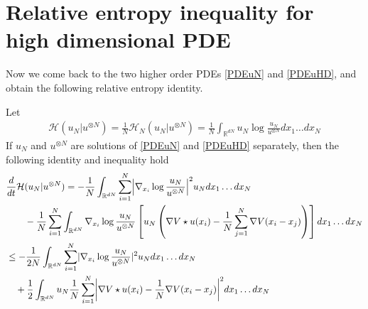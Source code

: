\section{Relative entropy inequality for high dimensional PDE}
Now we come back to the two higher order PDEs \autoref{PDEuN} and \autoref{PDEuHD}, and obtain the following relative entropy identity.
\begin{lemma} Let 
	\begin{align}
	\label{REntropyN} \mathcal{H}(u_N | u^{\otimes N} )= \frac{1}{N} \mathcal{H}_N(u_N | u^{\otimes N} ) = \frac{1}{N} \int_{\mathbb{R}^{dN} } u_N \log \frac{u_N}{u^{\otimes N} }   dx_{1}\ldots dx_N
	\end{align}
	If $u_N$ and $u^{\otimes N}$ are solutions of  \autoref{PDEuN} and \autoref{PDEuHD} separately, then the following identity and inequality hold
	\begin{align}
	\label{relativeentropyID} 
	&\frac{d}{dt} \mathcal{H}(u_{N} | u^{\otimes N}  ) = -   \frac{1}{N} \int_{\mathbb{R}^{dN} } \sum_{i=1}^{N}  \abs*{\nabla_{x_i} \log \frac{u_N}{u^{\otimes N} }}^2 u_N dx_{1}\ldots dx_N\\
\nonumber	&\qquad - \frac{1}{N} \sum_{i=1}^{N} \int_{\mathbb{R}^{dN} }  \nabla_{x_i} \log \frac{u_N}{u^{\otimes N} } \left[ u_N \left(\nabla V \star u(x_i) - \frac{1}{N} \sum_{j=1}^{N} \nabla V(x_i-x_j) \right) \right]   dx_{1}\ldots dx_N\\
\label{REntropyNM}  &\le - \frac{1}{2N} \int_{\mathbb{R}^{dN} } \sum_{i=1}^{N} \abs{\nabla_{x_i} \log \frac{u_N}{u^{\otimes N} }}^2 u_N dx_{1}\ldots dx_N\\
\nonumber &\quad + \frac{1}{2} \int_{\mathbb{R}^{dN} } u_N \frac{1}{N} \sum_{i=1}^{N}  \abs*{\nabla V \star  u (x_i) - \frac{1}{N} \nabla V(x_i-x_j) }^2 dx_{1}\ldots dx_N
	\end{align}
\end{lemma}
